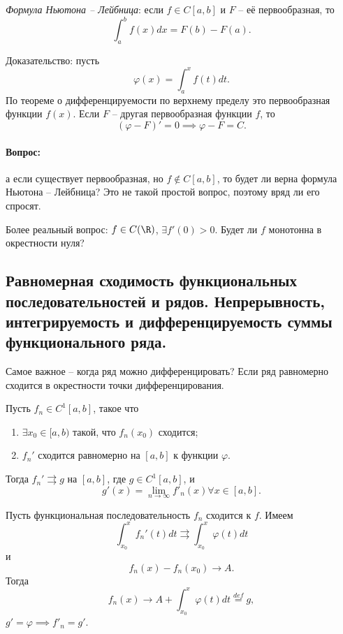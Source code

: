 \textit{Формула Ньютона -- Лейбница}: если $f \in C[a, b]$ и $F$ -- её первообразная, то
\begin{equation*}
    \int_a^b f(x) dx = F(b) - F(a).
\end{equation*}

Доказательство: пусть
\begin{equation*}
    \varphi(x) = \int_a^x f(t) dt.
\end{equation*}
По теореме о дифференцируемости по верхнему пределу это первообразная функции $f(x)$. Если $F$ -- другая первообразная функции $f$, то
\begin{equation*}
    (\varphi - F)' = 0 \implies \varphi - F = C.
\end{equation*}

\paragraph*{Вопрос:} а если существует первообразная, но $f \notin C[a, b]$, то будет ли верна формула Ньютона -- Лейбница? Это не такой простой вопрос, поэтому вряд ли его спросят.

Более реальный вопрос: $f \in C(\R)$, $\exists f'(0) > 0$. Будет ли $f$ монотонна в окрестности нуля?

\subsection{Равномерная сходимость функциональных последовательностей и рядов.
Непрерывность, интегрируемость и дифференцируемость суммы функционального
ряда.}

Самое важное -- когда ряд можно дифференцировать? Если ряд равномерно сходится в окрестности точки дифференцирования. 

Пусть $f_n \in C^1[a, b]$, такое что
\begin{enumerate}
    \item $\exists x_0 \in [a, b)$ такой, что $f_n(x_0)$ сходится;
    \item $f_n'$ сходится равномерно на $[a, b]$ к функции $\varphi$.
\end{enumerate}
Тогда $f_n' \rightrightarrows g$ на $[a, b]$, где $g \in C^1[a, b]$, и
\begin{equation*}
    g'(x) = \lim_{n \to \infty} f'_n(x) \forall x \in [a, b].
\end{equation*}
	
Пусть функциональная последовательность $f_n$ сходится к $f$. Имеем
\begin{equation*}
    \int_{x_0}^x f_n' (t) dt \rightrightarrows \int_{x_0}^x \varphi(t) dt
\end{equation*}
и 
\begin{equation*}
    f_n(x) - f_n(x_0) \to A.
\end{equation*}
Тогда
\begin{equation*}
    f_n(x) \to A + \int_{x_0}^x \varphi(t) dt \overset{def}{=} g,
\end{equation*}
$g' = \varphi \implies f'_n = g'$.

